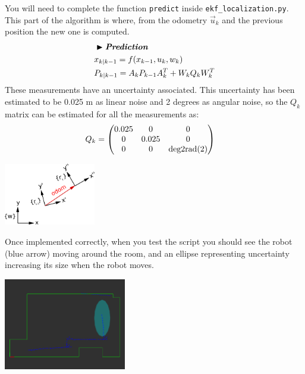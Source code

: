 \documentclass[a4paper,10pt]{article}
\begin{document}
You will need to complete the function \texttt{predict} inside \texttt{ekf\_localization.py}. This part of the algorithm is where, from the odometry $\vec{u}_k$ and the previous position the new one is computed. 
\begin{align*}
    & \blacktriangleright \textit{\textbf{Prediction}}\\
    & x_{k|k-1} = f(x_{k-1} ,u_k, w_k) \\
    & P_{k|k-1} = A_k P_{k-1} A_k^T + W_k Q_k W_k^T
\end{align*}
These measurements have an uncertainty associated. This uncertainty has been estimated to be 0.025 m as linear noise and 2 degrees as angular noise, so the $Q_k$ matrix can be estimated for all the measurements as:
\begin{align}
    \label{q_k}
    Q_k &= \begin{pmatrix}
	    0.025 & 0 & 0\\0 & 0.025 & 0\\ 0 & 0 & \textnormal{deg2rad}(2)
	\end{pmatrix}
\end{align}

\begin{center}
	\includegraphics[width=0.30\textwidth]{pict/prediction.png}
	\label{odometry}
\end{center}

Once implemented correctly, when you test the script you should see the robot (blue arrow) moving around the room, and an ellipse representing uncertainty increasing its size when the robot moves.

\begin{center}
	\includegraphics[width=0.40\textwidth]{pict/uncert.png}
	\label{no_updates}
\end{center}
\end{document}
